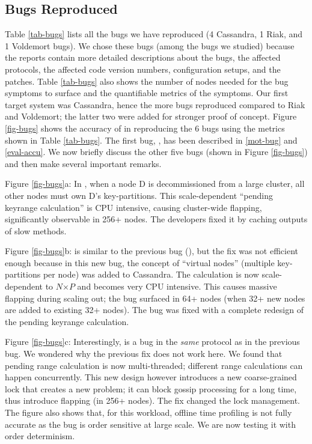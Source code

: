 

\subsection{Bugs Reproduced}
\label{eval-bugs}



Table \ref{tab-bugs} lists all the \numEval bugs we have reproduced (4
Cassandra, 1 Riak, and 1 Voldemort bugs).  We chose these \numEval bugs (among
the \totAll bugs we studied) because the reports contain more detailed
descriptions about the bugs, the affected protocols, the affected code version
numbers, configuration setups, and the patches.  Table \ref{tab-bugs} also
shows the number of nodes needed for the bug symptoms to surface and the
quantifiable metrics of the symptoms.
%
Our first target system was Cassandra, hence the more bugs reproduced compared
to Riak and Voldemort; the latter two were added for  stronger proof of
concept.
%
Figure \ref{fig-bugs} shows the accuracy of \sck in reproducing the 6 bugs
using the metrics shown in Table \ref{tab-bugs}.
%
The first bug, \caone, has been described in \sec\ref{mot-bug} and
\sec\ref{eval-accu}.
%
We now briefly discuss the other five bugs (shown in Figure \ref{fig-bugs}) and
then
%
make several important remarks.



Figure \ref{fig-bugs}a: In \catwo \cite{CA-Two}, 
when a node D is decommissioned from a
large cluster, all other nodes must own D's key-partitions.
This scale-dependent ``pending keyrange calculation'' is CPU intensive,
causing cluster-wide flapping, significantly observable in 256+ nodes.
The developers fixed it by caching outputs of slow methods.

Figure \ref{fig-bugs}b: \catri \cite{CA-Tri} 
is similar to the previous bug (\catwo),
but the fix was not efficient enough because in this new bug, the concept
of ``virtual nodes'' (multiple key-partitions per node) was added to
Cassandra.  The calculation is now scale-dependent to $N$$\times$$P$ and
becomes very CPU intensive.  This causes massive flapping during scaling out; 
the bug surfaced in 64+ nodes (when 32+ new nodes are added
to existing 32+ nodes). The bug was fixed with a complete 
redesign of the pending keyrange calculation.
%





Figure \ref{fig-bugs}c: Interestingly, \cafour \cite{CA-Four} is 
a bug in the {\em same}
protocol as in the previous bug.  We wondered why the previous fix does
not work here.  We found that pending range calculation is now
multi-threaded; different range calculations can happen concurrently.
This new design however introduces a new coarse-grained lock that creates
a new problem;  it can block gossip processing for a long
time, thus introduce flapping (in 256+ nodes).  The fix changed the
lock management.
%
The figure also shows that, for this workload, offline time profiling
is not fully accurate as the bug is order sensitive at large scale.
We are now testing it with order determinism. 


